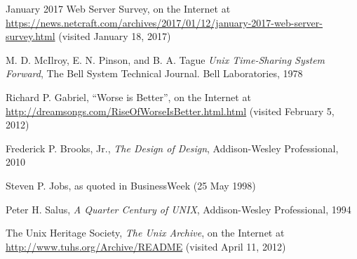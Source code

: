 \begin{thebibliography}{99}
January 2017 Web Server Survey, on the Internet at
\url{https://news.netcraft.com/archives/2017/01/12/january-2017-web-server-survey.html}
(visited January 18, 2017)

M. D. McIlroy, E. N. Pinson, and B. A.
Tague {\em Unix Time-Sharing System Forward}, The Bell System Technical
Journal. Bell Laboratories, 1978

Richard P. Gabriel, ``Worse is Better'',
on the Internet at
\url{http://dreamsongs.com/RiseOfWorseIsBetter.html.html} (visited February 5,
2012)

Frederick P. Brooks, Jr., {\em The Design of
Design}, Addison-Wesley Professional, 2010

Steven P. Jobs, as quoted in BusinessWeek (25 May 1998)

Peter H. Salus, {\em A Quarter Century of UNIX},
Addison-Wesley Professional, 1994

The Unix Heritage Society, {\em The Unix Archive},
on the Internet at
\url{http://www.tuhs.org/Archive/README} (visited April 11, 2012)

\end{thebibliography}
